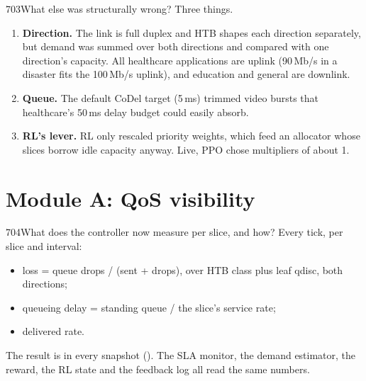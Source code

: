 \begin{qa}{703}{What else was structurally wrong?}
Three things.
\begin{enumerate}
\item \textbf{Direction.} The link is full duplex and HTB shapes each direction separately, but demand was summed over
both directions and compared with one direction's capacity. All healthcare applications are uplink (90\,Mb/s in a
disaster fits the 100\,Mb/s uplink), and education and general are downlink.
\item \textbf{Queue.} The default CoDel target (5\,ms) trimmed video bursts that healthcare's 50\,ms delay budget could
easily absorb.
\item \textbf{RL's lever.} RL only rescaled priority weights, which feed an allocator whose slices borrow idle capacity
anyway. Live, PPO chose multipliers of about 1.
\end{enumerate}
\end{qa}

\section{Module A: QoS visibility}

\begin{qa}{704}{What does the controller now measure per slice, and how?}
Every tick, per slice and interval:
\begin{itemize}
\item loss = queue drops / (sent + drops), over HTB class plus leaf qdisc, both directions;
\item queueing delay = standing queue / the slice's service rate;
\item delivered rate.
\end{itemize}
The result is  in every snapshot (). The SLA monitor, the demand
estimator, the reward, the RL state and the feedback log all read the same numbers.
\end{qa}

